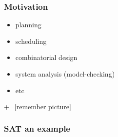 \documentclass{beamer}
\begin{document}
\begin{frame}

\frametitle{Motivation}
	\begin{itemize}
		\item planning
		\item scheduling
		\item combinatorial design
		\item system analysis (model-checking)
		\item etc
	\end{itemize}
\end{frame}

\begin{frame}

+=[remember picture]
\frametitle{SAT an example}
\everymath{\displaystyle}
\centering



\end{frame}
\end{document}
